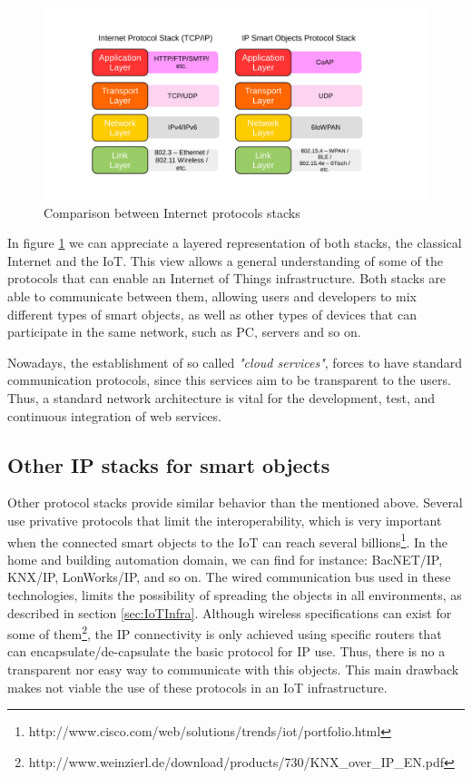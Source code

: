 \begin{figure}[htb]
	\centering
	\includegraphics[width=1\columnwidth]{chapters/background.images/Layers.pdf}
	\caption{Comparison between Internet protocols stacks}
	\label{fig:IPLayers}
\end{figure}

In figure \ref{fig:IPLayers} we can appreciate a layered representation of both stacks, the classical Internet and the IoT.
This view allows a general understanding of some of the protocols that can enable an Internet of Things infrastructure.
Both stacks are able to communicate between them, allowing users and developers to mix different types of smart objects, as well as other types of devices that can participate in the same network, such as PC, servers and so on.

Nowadays, the establishment of so called \textit{"cloud services"}, forces to have standard communication protocols, since this services aim to be transparent to the users.
Thus, a standard network architecture is vital for the development, test, and continuous integration of web services.

\subsection{Other IP stacks for smart objects}
Other protocol stacks provide similar behavior than the mentioned above.
Several use privative protocols that limit the interoperability, which is very important when the connected smart objects to the IoT can reach several billions\footnote{http://www.cisco.com/web/solutions/trends/iot/portfolio.html}.
In the home and building automation domain, we can find for instance: BacNET/IP, KNX/IP, LonWorks/IP, and so on.
The wired communication bus used in these technologies, limits the possibility of spreading the objects in all environments, as described in section \ref{sec:IoTInfra}.
Although wireless specifications can exist for some of them\footnote{http://www.weinzierl.de/download/products/730/KNX\_over\_IP\_EN.pdf}, the IP connectivity is only achieved using specific routers that can encapsulate/de-capsulate the basic protocol for IP use.
Thus, there is no a transparent nor easy way to communicate with this objects.
This main drawback makes not viable the use of these protocols in an IoT infrastructure.

